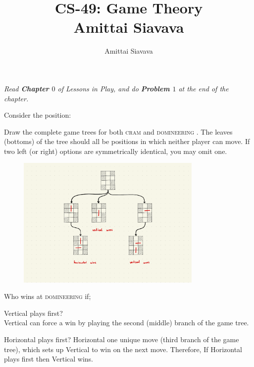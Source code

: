 \documentclass[11pt, reqno]{amsart}
\begin{document}

\title{CS-49: Game Theory\\ Amittai Siavava \\ }
\author{Amittai Siavava}


\setlength{\headheight}{13.0pt}
\setlength{\footskip}{15.0pt}

\maketitle

\def \cram { \textsc{cram} }
\def \dom { \textsc{domineering} }

\begin{problem}[4]
  \emph{Read \textbf{Chapter $0$} of Lessons in Play, and do \textbf{Problem $1$} at the end of the chapter.}

  \step
  Consider the position:

  \begin{enumalph}
    \item Draw the complete game trees for both \cram
      and \dom. The leaves (bottoms) of the tree
      should all be positions in which neither player can move.
      If two left (or right) options are symmetrically identical, you may omit one.

      \begin{figure}[H]
        
        \includegraphics[width=0.8\textwidth]{game-graph.pdf}
      \end{figure}

    \item Who wins at \dom if;
      \begin{enumroman}
        \item Vertical plays first? \\
          Vertical can force a win by playing
          the second (middle) branch of the game tree.
        \item Horizontal plays first?
          Horizontal one unique move (third branch of the game tree),
          which sets up Vertical to win on the next move.
          Therefore, If Horizontal plays first then Vertical wins.
      \end{enumroman}
      

\end{enumalph}
\end{problem}
\end{document}
